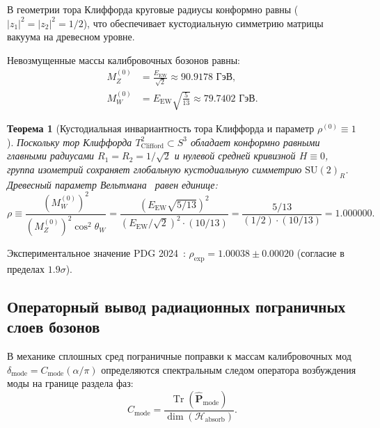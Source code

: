 \documentclass[11pt,a4paper]{article}
\newtheorem{theorem}{Теорема}
\theoremstyle{definition}
\theoremstyle{remark}
\begin{document}
В геометрии тора Клиффорда круговые радиусы конформно равны ($|z_1|^2 = |z_2|^2 = 1/2$), что обеспечивает кустодиальную симметрию матрицы вакуума на древесном уровне.
	
Невозмущенные массы калибровочных бозонов равны:
\begin{align}
	M_Z^{(0)} &= \frac{E_{\mathrm{EW}}}{\sqrt{2}} \approx 90.9178\text{ ГэВ}, \label{eq:m_z_bare_exact} \\
	M_W^{(0)} &= E_{\mathrm{EW}} \sqrt{\frac{5}{13}} \approx 79.7402\text{ ГэВ}. \label{eq:m_w_bare_exact}
\end{align}
	
\begin{theorem}[Кустодиальная инвариантность тора Клиффорда и параметр $\rho^{(0)} \equiv 1$]
\label{thm:custodial_symmetry_clifford}
Поскольку тор Клиффорда $T^2_{\mathrm{Clifford}} \subset S^3$ обладает конформно равными главными радиусами $R_1 = R_2 = 1/\sqrt{2}$ и нулевой средней кривизной $H \equiv 0$, группа изометрий сохраняет глобальную кустодиальную симметрию $\mathrm{SU}(2)_R$. Древесный параметр Вельтмана~\cite{Veltman1977} равен единице:
\begin{equation}
	\rho \equiv \frac{\left(M_W^{(0)}\right)^2}{\left(M_Z^{(0)}\right)^2 \cos^2\theta_W} = \frac{\left(E_{\mathrm{EW}}\sqrt{5/13}\right)^2}{\left(E_{\mathrm{EW}}/\sqrt{2}\right)^2 \cdot (10/13)} = \frac{5/13}{(1/2) \cdot (10/13)} = 1.000000.
\label{eq:rho_tree_exact}
\end{equation}
\end{theorem}
Экспериментальное значение PDG 2024~\cite{PDG2024}: $\rho_{\mathrm{exp}} = 1.00038 \pm 0.00020$ (согласие в пределах $1.9\sigma$).
	
\subsection{Операторный вывод радиационных пограничных слоев бозонов}

В механике сплошных сред пограничные поправки к массам калибровочных мод $\delta_{\mathrm{mode}} = C_{\mathrm{mode}} (\alpha/\pi)$ определяются спектральным следом оператора возбуждения моды на границе раздела фаз:
\begin{equation}
    C_{\mathrm{mode}} = \frac{\operatorname{Tr}(\hat{\mathbf{P}}_{\mathrm{mode}})}{\dim(\mathcal{H}_{\mathrm{absorb}})}.
    \label{eq:operator_trace_general_formula}
\end{equation}
\end{document}
